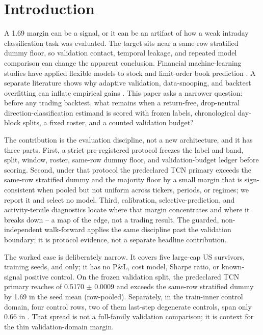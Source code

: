 \section{Introduction}

A 1.69\pp{} \macrofone{} margin can be a signal, or it can be an artifact of
how a weak intraday classification task was evaluated. The target sits near a
same-row stratified dummy floor, so validation contact, temporal leakage, and
repeated model comparison can change the apparent conclusion. Financial
machine-learning studies have applied flexible models to stock and limit-order
book prediction \cite{gu2020empirical,zhang2019deeplob}. A separate literature
shows why adaptive validation, data-snooping, and backtest overfitting can
inflate empirical gains
\cite{kapoor2023leakage,bailey2016probability,harvey2016cross}. This paper
asks a narrower question: before any trading backtest, what remains when a
return-free, drop-neutral direction-classification estimand is scored with
frozen labels, chronological day-block splits, a fixed roster, and a counted
validation budget?

The contribution is the evaluation discipline, not a new architecture, and it
has three parts. First, a strict pre-registered protocol freezes the label and
band, split, window, roster, same-row dummy floor, and validation-budget ledger
before scoring. Second, under that protocol the predeclared TCN primary exceeds
the same-row stratified dummy and the majority floor by a small margin that is
sign-consistent when pooled but not uniform across tickers, periods, or regimes;
we report it and select no model. Third, calibration, selective-prediction, and
activity-tercile diagnostics locate where that margin concentrates and where it
breaks down -- a map of the edge, not a trading result. The guarded,
non-independent walk-forward applies the same discipline past the
validation boundary; it is protocol evidence, not a separate headline
contribution.

The worked case is deliberately narrow. It covers five large-cap US survivors,
\numseeds{} training seeds, and \macrofone{} only; it has no P\&L, cost model,
Sharpe ratio, or known-signal positive control. On the frozen validation split,
the predeclared TCN primary reaches \macrofone{} of 0.5170 \(\pm\) 0.0009 and
exceeds the same-row stratified dummy by 1.69\pp{} in the seed mean
(row-pooled). Separately, in the train-inner control domain, four control rows,
two of them last-step degenerate controls, span only 0.66\pp{} in \macrofone{}.
That spread is not a full-family validation comparison; it is context for the
thin validation-domain margin.

